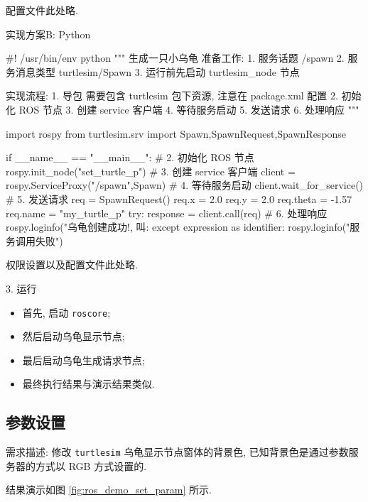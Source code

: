 \documentclass[openany, fontset=windowsold]{ctexbook}
\theoremstyle{kaiti}
\theoremstyle{normal}
\begin{document}
配置文件此处略.

实现方案B: Python

\begin{python}
  #! /usr/bin/env python
  """
      生成一只小乌龟
      准备工作:
          1. 服务话题 /spawn
          2. 服务消息类型 turtlesim/Spawn
          3. 运行前先启动 turtlesim_node 节点

      实现流程:
          1. 导包
            需要包含 turtlesim 包下资源, 注意在 package.xml 配置
          2. 初始化 ROS 节点
          3. 创建 service 客户端
          4. 等待服务启动
          5. 发送请求
          6. 处理响应
  """

  import rospy
  from turtlesim.srv import Spawn,SpawnRequest,SpawnResponse

  if __name__ == "__main__":
      # 2. 初始化 ROS 节点
      rospy.init_node("set_turtle_p")
      # 3. 创建 service 客户端
      client = rospy.ServiceProxy("/spawn",Spawn)
      # 4. 等待服务启动
      client.wait_for_service()
      # 5. 发送请求
      req = SpawnRequest()
      req.x = 2.0
      req.y = 2.0
      req.theta = -1.57
      req.name = "my_turtle_p"
      try:
          response = client.call(req)
          # 6. 处理响应
          rospy.loginfo("乌龟创建成功!, 叫:%
      except expression as identifier:
          rospy.loginfo("服务调用失败")
\end{python}

权限设置以及配置文件此处略.

3. 运行

\begin{itemize}
  \item 首先, 启动 \verb|roscore|;
  \item 然后启动乌龟显示节点; 
  \item 最后启动乌龟生成请求节点; 
  \item 最终执行结果与演示结果类似.
\end{itemize}

\subsection{参数设置}

需求描述: 修改 \verb|turtlesim| 乌龟显示节点窗体的背景色, 已知背景色是通过参数服务器的方式以 RGB 方式设置的.

结果演示如图 \ref{fig:ros_demo_set_param} 所示.
\end{document}
